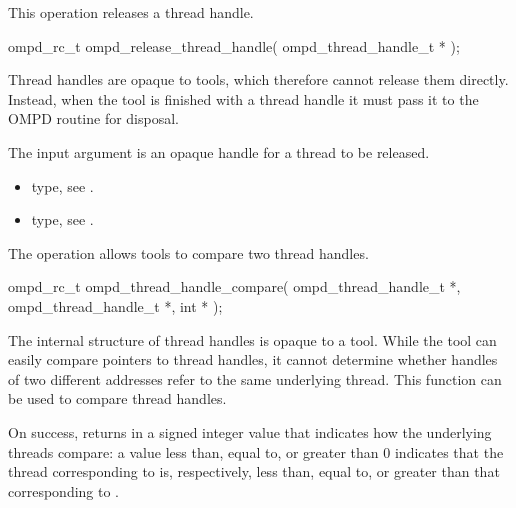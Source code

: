 \label{subsubsubsec:ompd_release_thread_handle}
\summary
This operation releases a thread handle.

\format

\begin{cspecific}
\begin{ompSyntax}
ompd_rc_t ompd_release_thread_handle(
  ompd_thread_handle_t *
);
\end{ompSyntax}
\end{cspecific}


\descr
Thread handles are opaque to tools, which therefore cannot release them directly.
Instead, when the tool is finished with a thread handle it must pass it to the OMPD
 routine for disposal.

\argdesc
The input argument  is an opaque handle for a thread
to be released.

\crossreferences
\begin{itemize}
	\item {} type, see .
    \item {} type, see .
\end{itemize}


\label{subsubsubsec:ompd_thread_handle_compare}
\summary
The  operation allows tools to compare
two thread handles.

\format

\begin{cspecific}
\begin{ompSyntax}
ompd_rc_t ompd_thread_handle_compare(
  ompd_thread_handle_t *,
  ompd_thread_handle_t *,
  int *
);
\end{ompSyntax}
\end{cspecific}


\descr
The internal structure of thread handles is opaque to a tool. While the tool can easily compare
pointers to thread handles, it cannot determine whether handles of two different addresses
refer to the same underlying thread. This function can be used to compare thread handles.

On success,  returns in  a signed
integer value that indicates how the underlying threads compare: a value less than, equal to, or
greater than 0 indicates that the thread corresponding to  is, respectively,
less than, equal to, or greater than that corresponding to .

